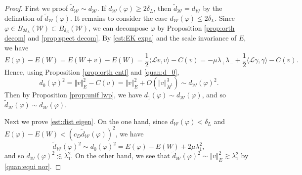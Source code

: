 \documentclass[reqno, 11pt]{amsart}
\numberwithin{equation}{section}
\theoremstyle{plain}
\theoremstyle{definition}
\numberwithin{equation}{section}
\numberwithin{theorem}{section}
\numberwithin{equation}{section}
\numberwithin{equation}{section}
\numberwithin{theorem}{section}
\begin{document}
	\begin{proof}
		First we proof $\widetilde{d}_{\mathcal{W}} \sim d_{\mathcal{W}}$. If $d_{\mathcal{W}}(\varphi)\geq 2\delta_L$, then $\widetilde{d}_{\mathcal{W}}=d_{\mathcal{W}}$ by the defination of $\widetilde{d}_{\mathcal{W}}(\varphi)$. It remains to consider the case $d_{\mathcal{W}}(\varphi)\leq 2\delta_L$. Since $\varphi\in B_{2\delta_L}(\mathcal{W})\subset B_{\delta_E}(\mathcal{W})$, we can  decompose $\varphi$ by Proposition \ref{prop:orth decom} and \ref{prop:spect decom}. By \eqref{est:EK expa} and the scale invariance of $E$, we have
		\begin{equation}\label{est:E expa}
		E(\varphi)-E(W)=E(W+v)-E(W)=\frac{1}{2}\langle \mathcal{L}v,v \rangle-C(v)=-\mu\lambda_+\lambda_-+\frac{1}{2}\langle \mathcal{L}\gamma,\gamma \rangle-C(v).
		\end{equation}
		Hence, using Proposition \ref{prop:orth cntl} and \eqref{quan:d_0},
		\begin{equation*}
		d_0(\varphi)^2=\Vert v \Vert_{E}^2-C(v)=\Vert v \Vert_{E}^2+O(\Vert v \Vert_{\dot H^1}^3)\sim d_{\mathcal{W}}(\varphi)^2.
		\end{equation*}
		Then by  Proposition \ref{prop:unif lwp}, we have $d_1(\varphi)\sim d_{\mathcal{W}}(\varphi)$, and so $\widetilde{d}_{\mathcal{W}}(\varphi)\sim d_{\mathcal{W}}(\varphi)$.
		
		Next we prove \eqref{est:dist eigen}. On the one hand, since $d_{\mathcal{W}}(\varphi)<\delta_{L}$ and $E(\varphi)-E(W)<(c_D\widetilde{d}_{\mathcal{W}}(\varphi))^2$, we have
		\begin{equation*}
		\widetilde{d}_{\mathcal{W}}(\varphi)^2 \sim d_0(\varphi)^2=E(\varphi)-E(W)+2\mu\lambda_{1}^2,
		\end{equation*}
		and so $\widetilde{d}_{\mathcal{W}}(\varphi)^2 \lesssim \lambda_{1}^2$. On the other hand, we see that $\widetilde{d}_{\mathcal{W}}(\varphi)^2\sim \Vert v \Vert_{E}^2 \gtrsim \lambda_{1}^2$ by \eqref{quan:equi nor}.
		

\end{proof}
\end{document}

